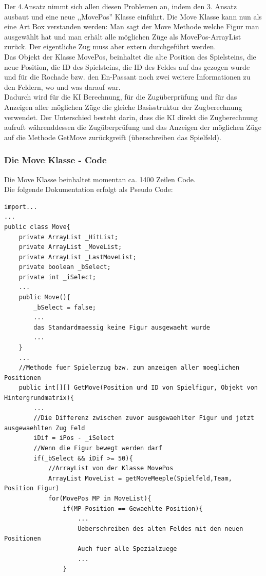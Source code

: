 \documentclass[12pt,a4paper]{article}
\begin{document}
{Der 4.Ansatz nimmt sich allen diesen Problemen an, indem den 3. Ansatz ausbaut und eine neue ,,MovePos'' Klasse einführt. Die Move Klasse kann nun als eine Art Box verstanden werden: Man sagt der Move Methode welche Figur man ausgewählt hat und man erhält alle möglichen Züge als MovePos-ArrayList zurück. Der eigentliche Zug muss aber extern durchgeführt werden. \\
Das Objekt der Klasse MovePos, beinhaltet die alte Position des Spielsteins, die neue Position, die ID des Spielsteins, die ID des Feldes auf das gezogen wurde und für die Rochade bzw. den En-Passant noch zwei weitere Informationen zu den Feldern, wo und was darauf war. \\
Dadurch wird für die KI Berechnung, für die Zugüberprüfung und für das Anzeigen aller möglichen Züge die gleiche Basisstruktur der Zugberechnung verwendet. Der Unterschied besteht darin, dass die KI direkt die Zugberechnung aufruft währenddessen die Zugüberprüfung und das Anzeigen der möglichen Züge auf die Methode GetMove zurückgreift (überschreiben das Spielfeld).\\


\subsubsection{Die Move Klasse - Code}
\label{SUBSUBSEC:MOVECODE}


Die Move Klasse beinhaltet momentan ca. 1400 Zeilen Code. \\
Die folgende Dokumentation erfolgt als Pseudo Code:

\lstset{language=Java}
\begin{lstlisting}
import...
...
public class Move{
	private ArrayList _HitList;
	private ArrayList _MoveList;
	private ArrayList _LastMoveList;
	private boolean _bSelect;
	private int _iSelect;
	...
	public Move(){
		_bSelect = false;
		...
		das Standardmaessig keine Figur ausgewaeht wurde
		...
	}			
	...
	//Methode fuer Spielerzug bzw. zum anzeigen aller moeglichen Positionen
	public int[][] GetMove(Position und ID von Spielfigur, Objekt von Hintergrundmatrix){
		...
		//Die Differenz zwischen zuvor ausgewaehlter Figur und jetzt ausgewaehlten Zug Feld		
		iDif = iPos - _iSelect
		//Wenn die Figur bewegt werden darf
		if(_bSelect && iDif >= 50){
			//ArrayList von der Klasse MovePos
			ArrayList MoveList = getMoveMeeple(Spielfeld,Team, Position Figur)
			for(MovePos MP in MoveList){
				if(MP-Position == Gewaehlte Position){
					...
					Ueberschreiben des alten Feldes mit den neuen Positionen
					Auch fuer alle Spezialzuege
					...		
				}
				

\end{lstlisting}}
\end{document}
